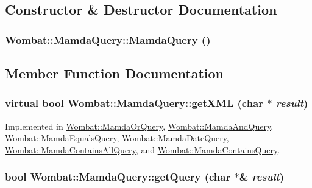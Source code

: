 \subsection{Constructor \& Destructor Documentation}
\hypertarget{classWombat_1_1MamdaQuery_998f28ab677d08357fc95986e24423b6}{
\subsubsection[MamdaQuery]{\setlength{\rightskip}{0pt plus 5cm}Wombat::Mamda\-Query::Mamda\-Query ()}}
\label{classWombat_1_1MamdaQuery_998f28ab677d08357fc95986e24423b6}




\subsection{Member Function Documentation}
\hypertarget{classWombat_1_1MamdaQuery_d5a4bbc29d9a752db0d07fa1e3aa2f25}{
\subsubsection[getXML]{\setlength{\rightskip}{0pt plus 5cm}virtual bool Wombat::Mamda\-Query::get\-XML (char $\ast$ {\em result})}}
\label{classWombat_1_1MamdaQuery_d5a4bbc29d9a752db0d07fa1e3aa2f25}




Implemented in \hyperlink{classWombat_1_1MamdaOrQuery_ea04c3b997cb90ba9df6232f304e3baf}{Wombat::Mamda\-Or\-Query}, \hyperlink{classWombat_1_1MamdaAndQuery_a48717e120cf124653793d81c04cc74d}{Wombat::Mamda\-And\-Query}, \hyperlink{classWombat_1_1MamdaEqualsQuery_885f8343de127e0af91a4b4ed098474f}{Wombat::Mamda\-Equals\-Query}, \hyperlink{classWombat_1_1MamdaDateQuery_8e0c342e335888cd44216830ad40a195}{Wombat::Mamda\-Date\-Query}, \hyperlink{classWombat_1_1MamdaContainsAllQuery_b904ded6460672fe834c0f704576d50c}{Wombat::Mamda\-Contains\-All\-Query}, and \hyperlink{classWombat_1_1MamdaContainsQuery_ba25722c7f1d89440a932b102fd276b0}{Wombat::Mamda\-Contains\-Query}.\hypertarget{classWombat_1_1MamdaQuery_22df53c6f854366ab7050050d0245e27}{
\subsubsection[getQuery]{\setlength{\rightskip}{0pt plus 5cm}bool Wombat::Mamda\-Query::get\-Query (char $\ast$\& {\em result})}}
\label{classWombat_1_1MamdaQuery_22df53c6f854366ab7050050d0245e27}


